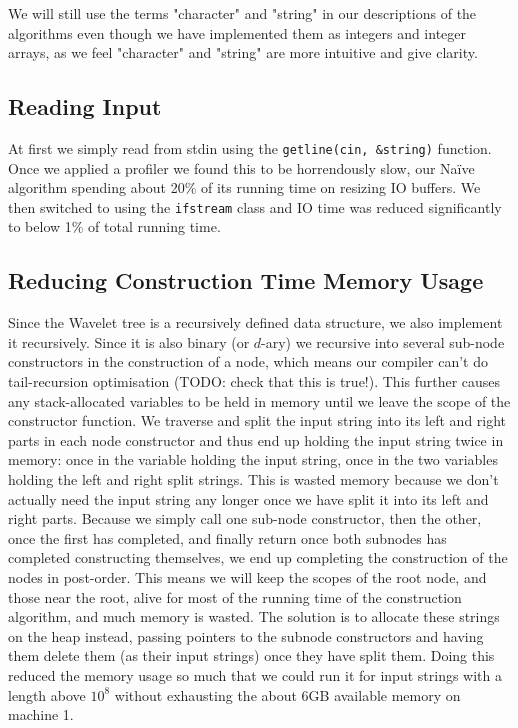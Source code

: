We will still use the terms "character" and "string" in our descriptions of the algorithms even though we have implemented them as integers and integer arrays, as we feel "character" and "string" are more intuitive and give clarity.


\subsection{Reading Input}
At first we simply read from stdin using the \texttt{getline(cin, \&string)} function. 
Once we applied a profiler we found this to be horrendously slow, our Naïve algorithm spending about 20\% of its running time on resizing IO buffers. 
We then switched to using the \texttt{ifstream} class and IO time was reduced significantly to below 1\% of total running time.

\subsection{Reducing Construction Time Memory Usage}
Since the Wavelet tree is a recursively defined data structure, we also implement it recursively. 
Since it is also binary (or $d$-ary) we recursive into several sub-node constructors in the construction of a node, which means our compiler can't do tail-recursion optimisation (TODO: check that this is true!). 
This further causes any stack-allocated variables to be held in memory until we leave the scope of the constructor function.
We traverse and split the input string into its left and right parts in each node constructor and thus end up holding the input string twice in memory: once in the variable holding the input string, once in the two variables holding the left and right split strings.
This is wasted memory because we don't actually need the input string any longer once we have split it into its left and right parts.
Because we simply call one sub-node constructor, then the other, once the first has completed, and finally return once both subnodes has completed constructing themselves, we end up completing the construction of the nodes in post-order.
This means we will keep the scopes of the root node, and those near the root, alive for most of the running time of the construction algorithm, and much memory is wasted.
The solution is to allocate these strings on the heap instead, passing pointers to the subnode constructors and having them delete them (as their input strings) once they have split them.
Doing this reduced the memory usage so much that we could run it for input strings with a length above $10^8$ without exhausting the about 6GB available memory on machine 1.





